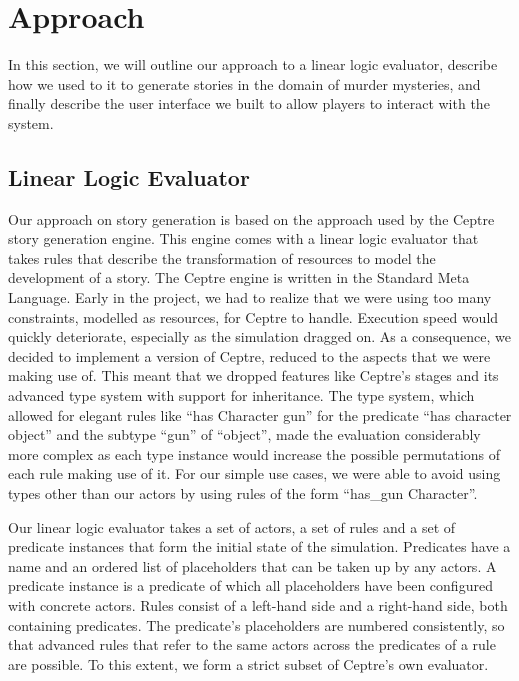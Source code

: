 \section{Approach}

In this section, we will outline our approach to a linear logic evaluator, describe how we used to it to generate stories in the domain of murder mysteries, and finally describe the user interface we built to allow players to interact with the system.

\subsection{Linear Logic Evaluator}

Our approach on story generation is based on the approach used by the Ceptre story generation engine. This engine comes with a linear logic evaluator that takes rules that describe the transformation of resources to model the development of a story. The Ceptre engine is written in the Standard Meta Language. Early in the project, we had to realize that we were using too many constraints, modelled as resources, for Ceptre to handle. Execution speed would quickly deteriorate, especially as the simulation dragged on. As a consequence, we decided to implement a version of Ceptre, reduced to the aspects that we were making use of. This meant that we dropped features like Ceptre's stages and its advanced type system with support for inheritance. The type system, which allowed for elegant rules like \enquote{has Character gun} for the predicate \enquote{has character object} and the subtype \enquote{gun} of \enquote{object}, made the evaluation considerably more complex as each type instance would increase the possible permutations of each rule making use of it. For our simple use cases, we were able to avoid using types other than our actors by using rules of the form \enquote{has\_gun Character}.

Our linear logic evaluator takes a set of actors, a set of rules and a set of predicate instances that form the initial state of the simulation. Predicates have a name and an ordered list of placeholders that can be taken up by any actors. A predicate instance is a predicate of which all placeholders have been configured with concrete actors. Rules consist of a left-hand side and a right-hand side, both containing predicates. The predicate's placeholders are numbered consistently, so that advanced rules that refer to the same actors across the predicates of a rule are possible. To this extent, we form a strict subset of Ceptre's own evaluator. 

